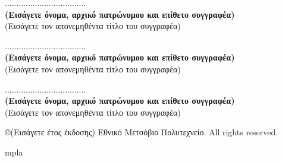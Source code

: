 \documentclass[12pt, twoside, a4paper]{report}
\begin{document}
\vspace{30ex}
\noindent
................................... \\
\textbf{(Εισάγετε όνομα, αρχικό πατρώνυμου και επίθετο συγγραφέα)} \\
(Εισάγετε τον απονεμηθέντα τίτλο του συγγραφέα) \\
\vspace{8ex}

\noindent
................................... \\
\textbf{(Εισάγετε όνομα, αρχικό πατρώνυμου και επίθετο συγγραφέα)} \\
(Εισάγετε τον απονεμηθέντα τίτλο του συγγραφέα) \\
\vspace{8ex}

\noindent
................................... \\
\textbf{(Εισάγετε όνομα, αρχικό πατρώνυμου και επίθετο συγγραφέα)} \\
(Εισάγετε τον απονεμηθέντα τίτλο του συγγραφέα) \\
\vspace{26ex}

\small
\noindent
\copyright \hspace{1em}(Εισάγετε έτος έκδοσης) Εθνικό Μετσόβιο Πολυτεχνείο.
All rights reserved.



\newpage
\thispagestyle{empty}
\mbox{}
\newpage

\setcounter{page}{1}
\tableofcontents
\newpage
\listoffigures









mpla ~\cite{gao2017containerleaks}


{}
\end{document}
